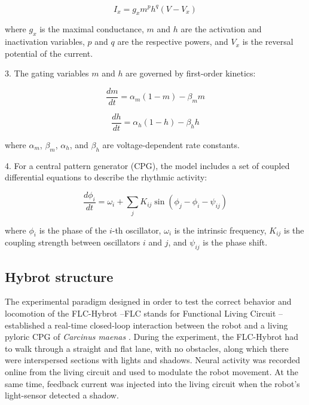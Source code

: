 \begin{equation}
	I_x = g_x m^p h^q (V - V_x)
\end{equation}

where \( g_x \) is the maximal conductance, \( m \) and \( h \) are the activation and inactivation variables, \( p \) and \( q \) are the respective powers, and \( V_x \) is the reversal potential of the current.

3. The gating variables \( m \) and \( h \) are governed by first-order kinetics:

\begin{equation}
	\frac{dm}{dt} = \alpha_m (1 - m) - \beta_m m
\end{equation}

\begin{equation}
	\frac{dh}{dt} = \alpha_h (1 - h) - \beta_h h
\end{equation}

where \( \alpha_m \), \( \beta_m \), \( \alpha_h \), and \( \beta_h \) are voltage-dependent rate constants.

4. For a central pattern generator (CPG), the model includes a set of coupled differential equations to describe the rhythmic activity:

\begin{equation}
	\frac{d\phi_i}{dt} = \omega_i + \sum_j K_{ij} \sin(\phi_j - \phi_i - \psi_{ij})
\end{equation}

where \( \phi_i \) is the phase of the \( i \)-th oscillator, \( \omega_i \) is the intrinsic frequency, \( K_{ij} \) is the coupling strength between oscillators \( i \) and \( j \), and \( \psi_{ij} \) is the phase shift.

\subsection{Hybrot structure}
\label{sec:robot setup}
The experimental paradigm designed in order to test the correct behavior and locomotion of the FLC-Hybrot --FLC stands for Functional Living Circuit \parencite{soetard_dynamical_2023}-- established a real-time closed-loop interaction between the robot and a living pyloric CPG of \textit{Carcinus maenas} \parencite{elices_robust_2019}. During the experiment, the FLC-Hybrot had to walk through a straight and flat lane, with no obstacles, along which there were interspersed sections with lights and shadows. Neural activity was recorded online from the living circuit and used to modulate the robot movement. At the same time, feedback current was injected into the living circuit when the robot's light-sensor detected a shadow.


